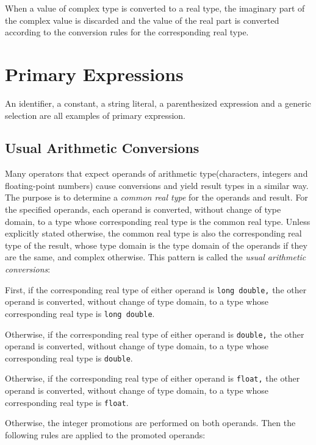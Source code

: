 When a value of complex type is converted to a real type, the imaginary part of
the complex value is discarded and the value of the real part is converted
according to the conversion rules for the corresponding real type.

\section{Primary Expressions}
An identifier, a constant, a string literal, a parenthesized expression and a
generic selection are all examples of primary expression.

\subsection{Usual Arithmetic Conversions}
Many operators that expect operands of arithmetic type(characters, integers and
floating-point numbers) cause conversions and
yield result types in a similar way. The purpose is to determine a
\textit{common real type} for the operands and result. For the specified
operands, each operand is converted, without change of type domain, to a type
whose corresponding real type is the common real type. Unless explicitly stated
otherwise, the common real type is also the corresponding real type of the
result, whose type domain is the type domain of the operands if they are the
same, and complex otherwise. This pattern is called the \textit{usual
  arithmetic conversions}:

\setlength{\leftskip}{1.5cm}

\noindent First, if the corresponding real type of either operand is \texttt{long
  double,} the other operand is converted, without change of type domain, to a
type whose corresponding real type is \texttt{long double}.


\noindent Otherwise, if the corresponding real type of either operand is \texttt{double,}
the other operand is converted, without change of type domain, to a type whose
corresponding real type is \texttt{double}.


\noindent Otherwise, if the corresponding real type of either operand is \texttt{float,}
the other operand is converted, without change of type domain, to a type whose
corresponding real type is \texttt{float}.


\noindent Otherwise, the integer promotions are performed on both operands. Then the
following rules are applied to the promoted operands:

\setlength{\leftskip}{3cm}

